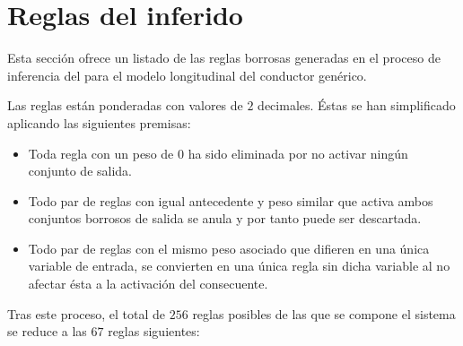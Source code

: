 \chapter{Reglas del  inferido}
\label{ch:derived-controller-rules}

Esta sección ofrece un listado de las reglas borrosas generadas en el proceso de inferencia del  para el modelo longitudinal del conductor genérico.

Las reglas están ponderadas con valores de $2$ decimales. Éstas se han simplificado aplicando las siguientes premisas:

\begin{itemize}
	\item Toda regla con un peso de $0$ ha sido eliminada por no activar ningún conjunto de salida.
	\item Todo par de reglas con igual antecedente y peso similar que activa ambos conjuntos borrosos de salida se anula y por tanto puede ser descartada.
	\item Todo par de reglas con el mismo peso asociado que difieren en una única variable de entrada, se convierten en una única regla sin dicha variable al no afectar ésta a la activación del consecuente.
\end{itemize}

Tras este proceso, el total de $256$ reglas posibles de las que se compone el sistema se reduce a las $67$ reglas siguientes:

